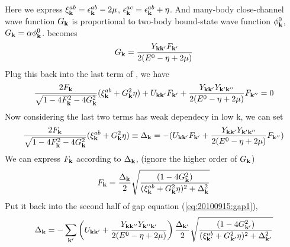 \documentclass{article}
\begin{document}
Here we express $\xi^{ab}_{\mathbf{k}}=\epsilon^{ab}_{\mathbf{k}}-2\mu$, $\epsilon^{ac}_{\mathbf{k}}=\epsilon^{ab}_{\mathbf{k}}+\eta$.  And many-body close-channel wave function $G_{\mathbf{k}}$ is proportional to two-body bound-state wave function $\phi_{\mathbf{k}}^{0}$,  $G_{\mathbf{k}}=\alpha\phi^{0}_{\mathbf{k}}$. 
 becomes
\begin{equation}\label{eq:20100915:GF}
G_{\mathbf{k}}=\frac{Y_{\mathbf{k}\mathbf{k}'}F_{\mathbf{k}'}}{2(E^{0}-\eta+2\mu)}
\end{equation}
Plug this back into the last term of , we have 
\begin{equation}
\frac{2F_{\mathbf{k}}}{\sqrt{1-4 F_{\mathbf{k}}^2-4 G_{\mathbf{k}}^2}} (\xi^{ab}_{\mathbf{k}}+  G_{\mathbf{k}}^2\eta)+U_{\mathbf{k}\mathbf{k}'}F_{\mathbf{k}'}+\frac{Y_{\mathbf{k}\mathbf{k}'}Y_{\mathbf{k}'\mathbf{k}''}}{2(E^{0}-\eta+2\mu)}F_{\mathbf{k}''}=0
\end{equation}
Now considering the last two terms has weak dependecy in low k, we can set 
\begin{equation}\label{eq:20100915:gap1}
\frac{2F_{\mathbf{k}}}{\sqrt{1-4 F_{\mathbf{k}}^2-4 G_{\mathbf{k}}^2}} (\xi^{ab}_{\mathbf{k}}+  G_{\mathbf{k}}^2\eta)\equiv\Delta_{\mathbf{k}}=-(U_{\mathbf{k}\mathbf{k}'}F_{\mathbf{k}'}+\frac{Y_{\mathbf{k}\mathbf{k}'}Y_{\mathbf{k}'\mathbf{k}''}}{2(E^{0}-\eta+2\mu)}F_{\mathbf{k}''})
\end{equation}
We can express $F_{\mathbf{k}}$ according to $\Delta_{\mathbf{k}}$,  (ignore the higher order of $G_{\mathbf{k}}$)
\begin{equation}\label{eq:20100915:F}
F_{\mathbf{k}}=\frac{\Delta_{\mathbf{k}}}2\sqrt{\frac{(1-4G_{\mathbf{k}}^{2})}{(\xi^{ab}_{\mathbf{k}}+  G_{\mathbf{k}}^2\eta)^{2}+\Delta_{\mathbf{k}}^{2}}}
\end{equation}
Put it back into the second half of gap equation (\ref{eq:20100915:gap1}), 
\begin{equation}\label{eq:20100915:onechannel}
\Delta_{\mathbf{k}}=-\sum_{\mathbf{k}'}\left(U_{\mathbf{k}\mathbf{k}'}+\frac{Y_{\mathbf{k}\mathbf{k}''}Y_{\mathbf{k}''\mathbf{k}'}}{2(E^{0}-\eta+2\mu)}\right)\frac{\Delta_{\mathbf{k}'}}2\sqrt{\frac{(1-4G_{\mathbf{k}'}^{2})}{(\xi^{ab}_{\mathbf{k}'}+  G_{\mathbf{k}'}^2\eta)^{2}+\Delta_{\mathbf{k}'}^{2}}}
\end{equation}
\end{document}

